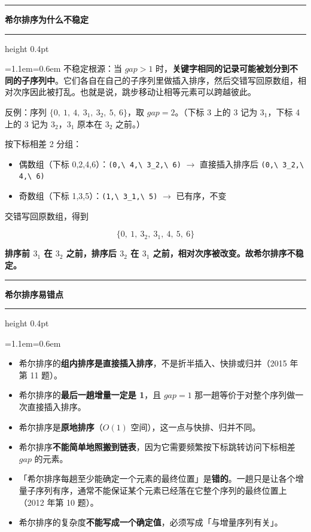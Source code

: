 \documentclass[11pt,openany,UTF8]{ctexbook}
\newcommand{\callouthead}[2]{%
  \par\addvspace{7pt}\noindent
  {\color{#1}\rule[-0.15em]{3pt}{1.05em}}\hspace{0.5em}%
  {\bfseries\color{#1}#2}\par\nobreak\vspace{-0.35em}%
  {\color{rulesep}\hrule height 0.4pt}\nobreak\vspace{0.45em}%
  \begingroup\small\setlength{\parindent}{0pt}%
  \leftskip=1.1em\rightskip=0.6em\noindent\ignorespaces}
\newcommand{\calloutend}{\par\endgroup\addvspace{7pt}}
\newenvironment{callkey}[1]{\callouthead{keybar}{#1}}{\calloutend}
\newenvironment{callwarn}[1]{\callouthead{warnbar}{#1}}{\calloutend}
\begin{document}
\begin{callkey}{希尔排序为什么不稳定}
不稳定根源：当 $gap>1$ 时，\textbf{关键字相同的记录可能被划分到不同的子序列中}。它们各自在自己的子序列里做插入排序，然后交错写回原数组，相对次序因此被打乱。也就是说，跳步移动让相等元素可以跨越彼此。

\end{callkey}

反例：序列 $\{0,\ 1,\ 4,\ 3_1,\ 3_2,\ 5,\ 6\}$，取 $gap=2$。（下标 3 上的 3 记为 $3_1$，下标 4 上的 3 记为 $3_2$，$3_1$ 原本在 $3_2$ 之前。）

按下标相差 2 分组：

\begin{itemize}
\item 偶数组（下标 0,2,4,6）：\texttt{(0,\allowbreak{}\textbackslash{} 4,\allowbreak{}\textbackslash{} 3\_2,\allowbreak{}\textbackslash{} 6)\allowbreak{}} $\to$ 直接插入排序后 \texttt{(0,\allowbreak{}\textbackslash{} 3\_2,\allowbreak{}\textbackslash{} 4,\allowbreak{}\textbackslash{} 6)\allowbreak{}}
\item 奇数组（下标 1,3,5）：\texttt{(1,\allowbreak{}\textbackslash{} 3\_1,\allowbreak{}\textbackslash{} 5)\allowbreak{}} $\to$ 已有序，不变
\end{itemize}
交错写回原数组，得到

\[\{0,\ 1,\ 3_2,\ 3_1,\ 4,\ 5,\ 6\}\]

\textbf{排序前 $3_1$ 在 $3_2$ 之前，排序后 $3_2$ 在 $3_1$ 之前，相对次序被改变。故希尔排序不稳定。}

\begin{callwarn}{希尔排序易错点}
\begin{itemize}
\item 希尔排序的\textbf{组内排序是直接插入排序}，不是折半插入、快排或归并（2015 年第 11 题）。
\item 希尔排序的\textbf{最后一趟增量一定是 1}，且 $gap=1$ 那一趟等价于对整个序列做一次直接插入排序。
\item 希尔排序是\textbf{原地排序}（$O(1)$ 空间），这一点与快排、归并不同。
\item 希尔排序\textbf{不能简单地照搬到链表}，因为它需要频繁按下标跳转访问下标相差 $gap$ 的元素。
\item 「希尔排序每趟至少能确定一个元素的最终位置」是\textbf{错的}。一趟只是让各个增量子序列有序，通常不能保证某个元素已经落在它整个序列的最终位置上（2012 年第 10 题）。
\item 希尔排序的复杂度\textbf{不能写成一个确定值}，必须写成「与增量序列有关」。
\end{itemize}
\end{callwarn}
\end{document}
